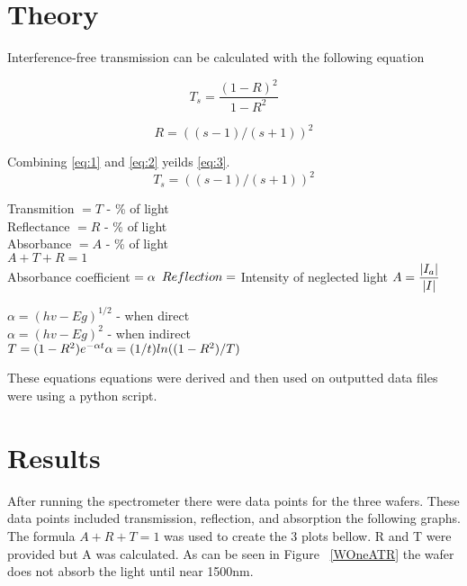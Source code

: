 \documentclass[10pt,a4paper]{article}
\begin{document}
\begin{multicols}{2}
\section*{Theory}

Interference-free transmission can be calculated with the following equation

\begin{equation}
\label{eq:1}
T_s = \dfrac{(1-R)^2}{1-R^2}
\end{equation}

\begin{equation}
\label{eq:2}
R = ((s-1)/(s+1))^2
\end{equation}

Combining \ref{eq:1} and \ref{eq:2} yeilds \ref{eq:3}.
\begin{equation}
\label{eq:3}
T_s = ((s-1)/(s+1))^2
\end{equation}

\begin{indentPar}{1cm}
\begin{indentPar}{1cm}
Transmition $= T$ - \% of light 
\\Reflectance $= R$ - \% of light
\\Absorbance  $= A $  - \% of light
\\$A+T+R = 1$
 \\Absorbance coefficient $= \alpha \\ $
 $\\Reflection =$ Intensity of neglected light
$\\A= \dfrac{|I_a|}{|I|}$

 $\alpha =(hv-Eg)^{1/2}$ - when direct \cite{tauc}
 \\$\alpha =(hv-Eg)^{2}$ - when indirect \cite{tauc}
 \\$T = (1-R^2)e^{-\alpha t}
 \\ \alpha = (1/t)ln((1-R^2)/T)$
\\
\end{indentPar}

These equations equations were derived and then used on outputted data files were using a python script. 
\end{indentPar}



\section*{Results}
After running the spectrometer there were data points for the three wafers. These data points included transmission, reflection, and absorption the following graphs.
\\
The formula $A+R+T = 1$ was used to create the 3 plots bellow. R and T were provided but A was calculated. As can be seen in Figure ~\ref{WOneATR} the wafer does not absorb the light until near 1500nm.\\



\end{multicols}
\end{document}
